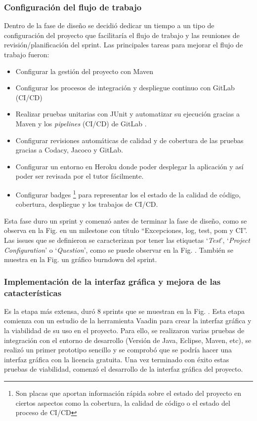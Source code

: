 \subsubsection{Configuración del flujo de trabajo}

Dentro de la fase de diseño se decidió dedicar un tiempo a un tipo de configuración del proyecto que facilitaría el flujo de trabajo y las reuniones de revisión/planificación del sprint. Las principales tareas para mejorar el flujo de trabajo fueron:
\begin{itemize}
	\item Configurar la gestión del proyecto con Maven
	\item Configurar los procesos de integración y despliegue continuo con GitLab (CI/CD)
	\item Realizar pruebas unitarias con JUnit y automatizar su ejecución gracias a Maven y los \textit{pipelines} (CI/CD) de GitLab .
	\item Configurar revisiones automáticas de calidad y de cobertura de las pruebas gracias a Codacy, Jacoco y GitLab.
	\item Configurar un entorno en Heroku donde poder desplegar la aplicación y así poder ser revisada por el tutor fácilmente.
	\item Configurar badges \footnote{Son placas que aportan información rápida sobre el estado del proyecto en ciertos aspectos como la cobertura, la calidad de código o el estado del proceso de CI/CD} para representar los el estado de la calidad de código, cobertura, despliegue y los trabajos de CI/CD.
\end{itemize}

Esta fase duro un sprint y comenzó antes de terminar la fase de diseño, como se observa en la Fig. en un milestone con título ``Excepciones, log, test, pom y CI''. Las issues que se definieron se caracterizan por tener las etiquetas `\textit{Test}', `\textit{Project Configuration}' o `\textit{Question}', como se puede observar en la Fig. . También se muestra en la Fig. un gráfico burndown del sprint.

\subsubsection{Implementación de la interfaz gráfica y mejora de las catacterísticas}
Es la etapa más extensa, duró 8 sprints que se muestran en la Fig. . Esta etapa comienza con un estudio de la herramienta Vaadin para crear la interfaz gráfica y la viabilidad de su uso en el proyecto. Para ello, se realizaron varias pruebas de integración con el entorno de desarrollo (Versión de Java, Eclipse, Maven, etc), se realizó un primer prototipo sencillo y se comprobó que se podría hacer una interfaz gráfica con la licencia gratuita. Una vez terminado con éxito estas pruebas de viabilidad, comenzó el desarrollo de la interfaz gráfica del proyecto.

